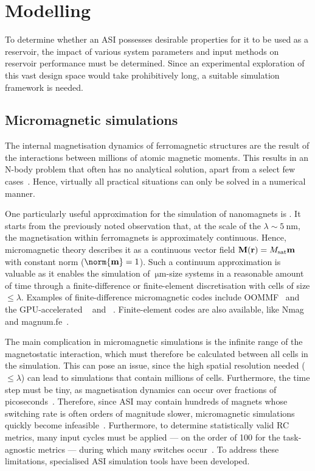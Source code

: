 \newpage
\section{Modelling}\label{sec:1:Modelling}
To determine whether an ASI possesses desirable properties for it to be used as a reservoir, the impact of various system parameters and input methods on reservoir performance must be determined.
Since an experimental exploration of this vast design space would take prohibitively long, a suitable simulation framework is needed.

\subsection{Micromagnetic simulations}
The internal magnetisation dynamics of ferromagnetic structures are the result of the interactions between millions of atomic magnetic moments.
This results in an N-body problem that often has no analytical solution, apart from a select few cases~\cite{PhD_Abert}.
Hence, virtually all practical situations can only be solved in a numerical manner. \par
One particularly useful approximation for the simulation of nanomagnets is .
It starts from the previously noted observation that, at the scale of the  $\lambda \sim \SI{5}{\nano\metre}$, the magnetisation within ferromagnets is approximately continuous.
Hence, micromagnetic theory describes it as a continuous vector field $\boldsymbol{\mathbf{M}}(\boldsymbol{\mathbf{r}}) = M_\mathrm{sat} \boldsymbol{\mathbf{m}}$ with constant norm ($\norm{\vc{m}} = 1$).
Such a continuum approximation is valuable as it enables the simulation of $\SI{}{\micro\metre}$-size systems in a reasonable amount of time through a finite-difference or finite-element discretisation with cells of size $\leq \lambda$.
Examples of finite-difference micromagnetic codes include OOMMF~\cite{OOMMF} and the GPU-accelerated \mumax~\cite{mumax3} and \mumaxplus~\cite{MOR-24}.
Finite-element codes are also available, like Nmag~\cite{Nmag} and magnum.fe~\cite{magnumFE}. \par %
The main complication in micromagnetic simulations is the infinite range of the magnetostatic interaction, which must therefore be calculated between all cells in the simulation.
This can pose an issue, since the high spatial resolution needed ($\leq \lambda$) can lead to simulations that contain millions of cells.
Furthermore, the time step must be tiny, as magnetisation dynamics can occur over fractions of picoseconds~\cite{PhD_Leliaert}.
Therefore, since ASI may contain hundreds of magnets whose switching rate is often orders of magnitude slower, micromagnetic simulations quickly become infeasible~\cite{leo2021chiral}.
Furthermore, to determine statistically valid RC metrics, many input cycles must be applied --- on the order of 100 for the task-agnostic metrics --- during which many switches occur~\cite{RC_TaskAgnosticMetrics_v2}.
To address these limitations, specialised ASI simulation tools have been developed.

